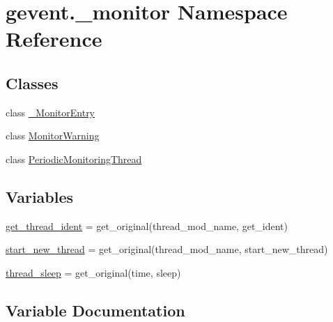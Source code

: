 \hypertarget{namespacegevent_1_1__monitor}{}\section{gevent.\+\_\+monitor Namespace Reference}
\label{namespacegevent_1_1__monitor}
\subsection*{Classes}
\begin{DoxyCompactItemize}
\item 
class \hyperlink{classgevent_1_1__monitor_1_1___monitor_entry}{\+\_\+\+Monitor\+Entry}
\item 
class \hyperlink{classgevent_1_1__monitor_1_1_monitor_warning}{Monitor\+Warning}
\item 
class \hyperlink{classgevent_1_1__monitor_1_1_periodic_monitoring_thread}{Periodic\+Monitoring\+Thread}
\end{DoxyCompactItemize}
\subsection*{Variables}
\begin{DoxyCompactItemize}
\item 
\hyperlink{namespacegevent_1_1__monitor_a886da3542b8187398654eae5f117286c}{get\+\_\+thread\+\_\+ident} = get\+\_\+original(thread\+\_\+mod\+\_\+name, \textquotesingle{}get\+\_\+ident\textquotesingle{})
\item 
\hyperlink{namespacegevent_1_1__monitor_aab5db1b7d352930f60e8415f116dc97c}{start\+\_\+new\+\_\+thread} = get\+\_\+original(thread\+\_\+mod\+\_\+name, \textquotesingle{}start\+\_\+new\+\_\+thread\textquotesingle{})
\item 
\hyperlink{namespacegevent_1_1__monitor_afc51c3665014a2de18a6c581ed544030}{thread\+\_\+sleep} = get\+\_\+original(\textquotesingle{}time\textquotesingle{}, \textquotesingle{}sleep\textquotesingle{})
\end{DoxyCompactItemize}


\subsection{Variable Documentation}
\mbox{\label{namespacegevent_1_1__monitor_a886da3542b8187398654eae5f117286c}} 
